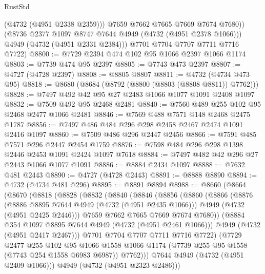 \begin{lexlean}{RustStd}
\begin{coremodule}
{\begin{coremodule}
{{{{{{{{{{{{{{              (@4732 (@4951 @2338 @2359)))
            @7659
            @7662
            @7665
            @7669
            @7674
            @7680))
        (@8736 @2377 @1097 @8747 @7644 @4949 (@4732 (@4951 @2378 @1066)))
        @4949
        (@4732 (@4951 @2331 @2384)))
      @7701
      @7704
      @7707
      @7711
      @7716
      @7722)
@8800 := @7729 @2394 @474 @102 @95 @1066 @2397 @1066 @1174
@8803 := @7739 @474 @95 @2397
@8805 := @7743 @473 @2397
@8807 := @4727 (@4728 @2397)
@8808 := @8805 @8807
@8811 := @4732 (@4734 @473 @95)
@8818 := @8680 (@8684 (@8792 (@8800 (@8803 (@8808 @8811)) @7762)))
@8828 := @7497 @492 @42 @95 @27 @2483 @1066 @1077 @1091 @2408 @1097
@8832 := @7509 @492 @95 @2468 @2481
@8840 := @7560 @489 @255 @102 @95 @2468 @2477 @1066 @2481
@8846 := @7569 @488 @7571 @148 @2468 @2475 @1787
@8856 := @7497 @486 @484 @296 @298 @2458 @2467 @2474 @1091 @2416 @1097
@8860 := @7509 @486 @296 @2447 @2456
@8866 := @7591 @485 @7571 @296 @2447 @2454 @1759
@8876 := @7598 @484 @296 @298 @1398 @2446 @2453 @1091 @2424 @1097 @7618
@8884 := @7497 @482 @42 @296 @27 @2443 @1066 @1077 @1091
@8886 := @8884 @2434 @1097
@8888 := @7632 @481 @2443
@8890 := @4727 (@4728 @2443)
@8891 := @8888 @8890
@8894 := @4732 (@4734 @481 @296)
@8895 := @8891 @8894
@8988 := @8660
    (@8664
      (@8670
        (@8818
          (@8828
            (@8832
              (@8840
                (@8846
                  (@8856
                    (@8860
                      (@8866
                        (@8876
                          (@8886 @8895 @7644 @4949 (@4732 (@4951 @2435 @1066)))
                          @4949
                          (@4732 (@4951 @2425 @2446)))
                        @7659
                        @7662
                        @7665
                        @7669
                        @7674
                        @7680))
                    (@8884 @354 @1097 @8895 @7644 @4949 (@4732 (@4951 @2461 @1066)))
                    @4949
                    (@4732 (@4951 @2417 @2467)))
                  @7701
                  @7704
                  @7707
                  @7711
                  @7716
                  @7722)
                (@7729
                  @2477
                  @255
                  @102
                  @95
                  @1066
                  @1558
                  @1066
                  @1174
                  (@7739 @255 @95 @1558 (@7743 @254 @1558 @6983 @6987))
                  @7762)))
            @7644
            @4949
            (@4732 (@4951 @2409 @1066)))
          @4949
          (@4732 (@4951 @2323 @2486)))
}}}}}}}}}}}}}}
\end{coremodule}}
\end{coremodule}
\end{lexlean}
